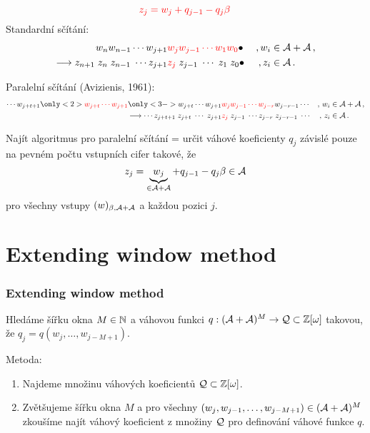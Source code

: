 \documentclass[11pt]{beamer}
\begin{document}
\begin{frame}
    $$
        \textcolor{red}{z_j=w_j + q_{j-1} - q_j \beta}\,
    $$
  Standardní sčítání:%
  \begin{align*}
    w_n w_{n-1}\cdots w_{j+1}& \textcolor{red}{w_j w_{j-1} \cdots w_1 w_0}\bullet& \,,w_i &\in \mathcal{A}+\mathcal{A}\,,    \\
    \longrightarrow z_{n+1}\; z_{n}\; z_{n-1}\;\cdots z_{j+1} &\textcolor{red}{z_j} \; z_{j-1}\; \cdots \;z_1 \; z_0\bullet& \,,z_i &\in \mathcal{A}\,.
  \end{align*}
    
  \pause 
   Paralelní sčítání (Avizienis, 1961):
  \begin{align*}
    \cdots w_{j+t+1}\only<2>{\textcolor{red}{w_{j+t} \cdots w_{j+1}}} \only<3->{w_{j+t} \cdots w_{j+1}}& \textcolor{red}{w_j w_{j-1} \cdots w_{j-r}}w_{j-r-1} \cdots &,\, w_i &\in \A + \A\,,    \\
    \longrightarrow \cdots z_{j+t+1}\;z_{j+t} \; \cdots \; z_{j+1} &\textcolor{red}{z_j} \; z_{j-1}\; \cdots z_{j-r}\;z_{j-r-1}\; \cdots &,\, z_i &\in \A\,.
  \end{align*}

    
\end{frame}

\begin{frame}
Najít algoritmus pro paralelní sčítání = určit váhové koeficienty $q_j$ závislé pouze na pevném počtu vstupních cifer takové, že 
    $$
        z_j=\underbrace{w_j}_{\in \mathcal{A} +\mathcal{A}} + q_{j-1} - q_j \beta \in \mathcal{A} 
    $$
    pro všechny vstupy $(w)_{\beta,\mathcal{A}+\mathcal{A}}$ a každou pozici $j$.
    
%    
\end{frame}


\section{Extending window method}
\begin{frame}
    \frametitle{Extending window method}
    
    Hledáme šířku okna $M \in \mathbb{N}$ a váhovou funkci $q:(\mathcal{A}+\mathcal{A})^{M} \rightarrow \mathcal{Q} \subset \mathbb{Z}[\omega]$ takovou, že $q_j=q(w_j, \dots, w_{j-M+1})$.
        
    \pause
    \vspace{20pt}
    Metoda:
    \begin{enumerate}
        \item Najdeme množinu váhových koeficientů $\mathcal{Q} \subset \mathbb{Z}[\omega]$.
        \item Zvětšujeme šířku okna $M$ a pro všechny $(w_j,w_{j-1}, \dots , w_{j-M+1}) \in (\mathcal{A}+\mathcal{A})^{M}$ zkoušíme najít váhový koeficient z množiny $\mathcal{Q}$ pro definování váhové funkce $q$.
    \end{enumerate}
\end{frame}
\end{document}
